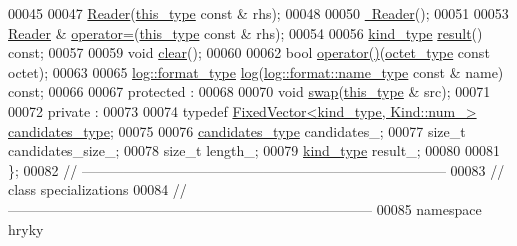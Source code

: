 \begin{DoxyCode}
00045 
00047     \hyperlink{classhryky_1_1uri_1_1scheme_1_1_reader_a46cc9166731a0ae7bbcb5fc388cd0815}{Reader}(\hyperlink{classhryky_1_1uri_1_1scheme_1_1_reader}{this_type} \textcolor{keyword}{const} & rhs);
00048 
00050     \hyperlink{classhryky_1_1uri_1_1scheme_1_1_reader_a2a92e2cdc595ba2010deabeb5e73c600}{~Reader}();
00051 
00053     \hyperlink{classhryky_1_1uri_1_1scheme_1_1_reader}{Reader} & \hyperlink{classhryky_1_1uri_1_1scheme_1_1_reader_a4bb2f0235a71f970721a7427e258587c}{operator=}(\hyperlink{classhryky_1_1uri_1_1scheme_1_1_reader}{this_type} \textcolor{keyword}{const} & rhs);
00054 
00056     \hyperlink{classhryky_1_1_kind}{kind_type} \hyperlink{classhryky_1_1uri_1_1scheme_1_1_reader_a80b3196405388f8e4c81fcdd3dd38661}{result}() \textcolor{keyword}{const};
00057 
00059     \textcolor{keywordtype}{void} \hyperlink{classhryky_1_1uri_1_1scheme_1_1_reader_a22183b64bccf3b69cf30a891dbc144c0}{clear}();
00060 
00062     \textcolor{keywordtype}{bool} \hyperlink{classhryky_1_1uri_1_1scheme_1_1_reader_a17fde133e05f4cebfaa80460623e7c28}{operator()}(\hyperlink{namespacehryky_a488cba8b666be33ccca70e819684e3c8}{octet_type} \textcolor{keyword}{const} octet);
00063 
00065     \hyperlink{classhryky_1_1_intrusive_ptr}{log::format_type} \hyperlink{classhryky_1_1uri_1_1scheme_1_1_reader_a8caaab2bc2e701f7d85e0fafd3829c60}{log}(\hyperlink{namespacehryky_1_1log_1_1format_ab7408d1e2ed2d648dbf9bba69eb74288}{log::format::name_type} \textcolor{keyword}{const} & name) \textcolor{keyword}{const};
00066 
00067 \textcolor{keyword}{protected} :
00068 
00070     \textcolor{keywordtype}{void} \hyperlink{classhryky_1_1uri_1_1scheme_1_1_reader_a6b7c635d0060515e333eb5d67e9e9182}{swap}(\hyperlink{classhryky_1_1uri_1_1scheme_1_1_reader}{this_type} & src);
00071 
00072 \textcolor{keyword}{private} :
00073 
00074     \textcolor{keyword}{typedef} \hyperlink{classhryky_1_1_fixed_vector}{FixedVector<kind_type, Kind::num_>} \hyperlink{classhryky_1_1_fixed_vector}{candidates_type};
00075 
00076     \hyperlink{classhryky_1_1_fixed_vector}{candidates_type}     candidates\_;
00077     \textcolor{keywordtype}{size\_t}              candidates\_size\_;
00078     \textcolor{keywordtype}{size\_t}              length\_;
00079     \hyperlink{classhryky_1_1_kind}{kind_type}           result\_;
00080 
00081 \};
00082 \textcolor{comment}{//
      ------------------------------------------------------------------------------}
00083 \textcolor{comment}{// class specializations}
00084 \textcolor{comment}{//
      ------------------------------------------------------------------------------}
00085 \textcolor{keyword}{namespace }hryky

\end{DoxyCode}
